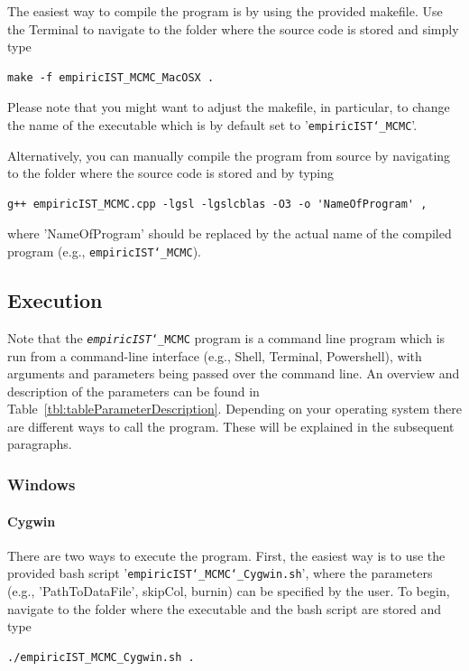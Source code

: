 \documentclass[12pt,a4paper]{scrartcl}
\begin{document}
The easiest way to compile the program is by using the provided makefile.
Use the Terminal to navigate to the folder where the source code is stored and simply type 
\begin{lstlisting}
make -f empiricIST_MCMC_MacOSX .
\end{lstlisting}
Please note that you might want to adjust the makefile, in particular, to change the name of the executable which is by default set to '\texttt{empiricIST\char`_MCMC}'.

Alternatively, you can manually compile the program from source by navigating to the folder where the source code is stored and by typing
\begin{lstlisting}
g++ empiricIST_MCMC.cpp -lgsl -lgslcblas -O3 -o 'NameOfProgram' ,
\end{lstlisting}
where 'NameOfProgram' should be replaced by the actual name of the compiled program (e.g., \texttt{empiricIST\char`_MCMC}). 
 
\subsection{Execution}
 
Note that the \texttt{\emph{empiricIST}\char`_MCMC} program is a command line program which is run from a command-line interface (e.g., Shell, Terminal, Powershell), with arguments and parameters being passed over the command line. An overview and description of the parameters can be found in Table~\ref{tbl:tableParameterDescription}.
Depending on your operating system there are different ways to call the program. These will be explained in the subsequent paragraphs.
 
\subsubsection*{Windows}
 
\paragraph{Cygwin}

There are two ways to execute the program. First, the easiest way is to use the provided bash script '\texttt{empiricIST\char`_MCMC\char`_Cygwin.sh}', where the parameters (e.g., 'PathToDataFile', skipCol, burnin) can be specified by the user.
To begin, navigate to the folder where the executable and the bash script are stored and type
\begin{lstlisting}
./empiricIST_MCMC_Cygwin.sh .
\end{lstlisting}
\end{document}
